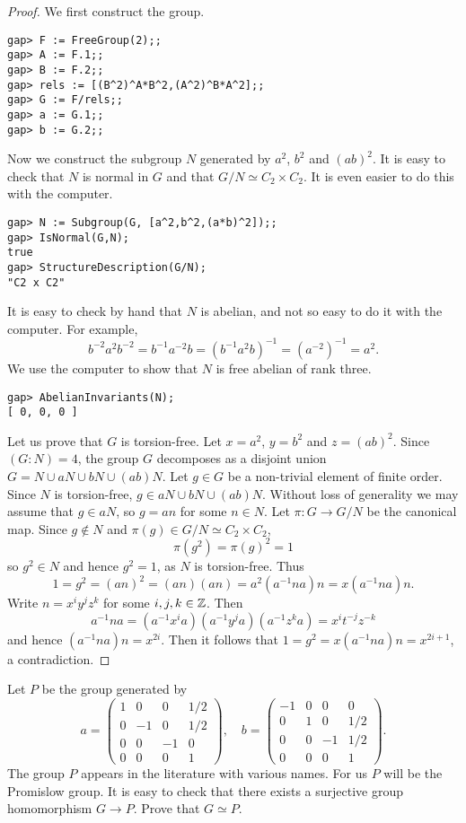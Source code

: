 \begin{proof}
    We first construct the group.
\begin{lstlisting}
gap> F := FreeGroup(2);;
gap> A := F.1;;
gap> B := F.2;;
gap> rels := [(B^2)^A*B^2,(A^2)^B*A^2];;
gap> G := F/rels;;
gap> a := G.1;;
gap> b := G.2;;
\end{lstlisting}
    Now we construct the subgroup $N$ generated by $a^2$, $b^2$ and $(ab)^2$. 
    It is easy to check that $N$ is normal 
    in $G$ and that $G/N\simeq C_2\times C_2$. It is even easier 
    to do this with the computer.
\begin{lstlisting}
gap> N := Subgroup(G, [a^2,b^2,(a*b)^2]);;
gap> IsNormal(G,N);
true
gap> StructureDescription(G/N);
"C2 x C2"
\end{lstlisting}
    It is easy to check by hand that $N$ is abelian, and not so easy to do it with
    the computer. For example, 
    \[
    b^{-2}a^2b^{-2}=b^{-1}a^{-2}b=(b^{-1}a^2b)^{-1}=(a^{-2})^{-1}=a^2.
    \]
    We use the computer to show that
    $N$ is free abelian of rank three. 
\begin{lstlisting}
gap> AbelianInvariants(N);
[ 0, 0, 0 ]
\end{lstlisting}
    Let us prove that $G$ is torsion-free. Let 
    $x=a^2$, $y=b^2$ and $z=(ab)^2$. 
    Since $(G:N)=4$, the group $G$ decomposes as a disjoint union
    $G=N\cup aN\cup bN\cup (ab)N$. Let $g\in G$ be a non-trivial element of finite order. 
    Since $N$ is torsion-free, $g\in aN\cup bN\cup (ab)N$. Without loss of generality 
    we may assume that $g\in aN$, so $g=an$ for some $n\in N$. 
    Let $\pi\colon G\to G/N$ be the canonical map. 
    Since $g\not\in N$ and $\pi(g)\in G/N\simeq C_2\times C_2$, 
    \[
    \pi(g^2)=\pi(g)^2=1
    \]
    so $g^2\in N$ and hence $g^2=1$, as $N$ is torsion-free.  Thus
    \[
    1=g^2=(an)^2=(an)(an)=a^2(a^{-1}na)n=x(a^{-1}na)n.
    \]
    Write $n=x^iy^jz^k$ for some $i,j,k\in\mathbb{Z}$. Then
    \[
    a^{-1}na=(a^{-1}x^ia)(a^{-1}y^ja)(a^{-1}z^ka)=x^it^{-j}z^{-k}
    \]
    and hence $(a^{-1}na)n=x^{2i}$. Then it follows that 
    $1=g^2=x(a^{-1}na)n=x^{2i+1}$, a contradiction. 
\end{proof}

Let $P$ be the group
generated by
\[
a=\begin{pmatrix}
1 & 0 & 0 & 1/2\\
0 & -1 & 0 & 1/2\\
0 & 0 & -1 & 0\\
0 & 0 & 0 & 1
\end{pmatrix},
\quad
b=\begin{pmatrix}
-1 & 0 & 0 & 0\\
0 & 1 & 0 & 1/2\\
0 & 0 & -1 & 1/2\\
0 & 0 & 0 & 1
\end{pmatrix}. 
\]
The group $P$ appears in the literature with various names. 
For us $P$ will be the Promislow group. It is easy to check
that there exists a surjective group homomorphism $G\to P$. 
Prove that $G\simeq P$. 

